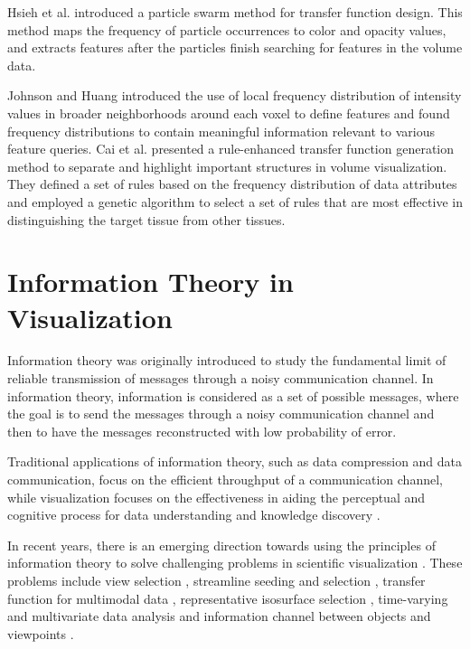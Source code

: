 Hsieh et al. \cite{hsieh_feature_2013} introduced a particle swarm method for transfer function design. This method maps the frequency of particle occurrences to color and opacity values, and extracts features after the particles finish searching for features in the volume data.

Johnson and Huang \cite{johnson_distribution-driven_2009} introduced the use of local frequency distribution of intensity values in broader neighborhoods around each voxel to define features and found frequency distributions to contain meaningful information relevant to various feature queries.
Cai et al. \cite{cai_rule-enhanced_2015} presented a rule-enhanced transfer function generation method to separate and highlight important structures in volume visualization. They defined a set of rules based on the frequency distribution of data attributes and employed a genetic algorithm to select a set of rules that are most effective in distinguishing the target tissue from other tissues.

\section{Information Theory in Visualization}
Information theory \cite{shannon_mathematical_1948} was originally introduced to study the fundamental limit of reliable transmission of messages through a noisy communication channel. In information theory, information is considered as a set of possible messages, where the goal is to send the messages through a noisy communication channel and then to have the messages reconstructed with low probability of error.

Traditional applications of information theory, such as data compression and data communication, focus on the efficient throughput of a communication channel, while visualization focuses on the effectiveness in aiding the perceptual and cognitive process for data understanding and knowledge discovery \cite{sbert_information_2009}.

In recent years, there is an emerging direction towards using the principles of information theory to solve challenging problems in scientific visualization \cite{wang_information_2011}. These problems include view selection \cite{bordoloi_view_2005} \cite{takahashi_feature-driven_2005} \cite{feixas_unified_2009}, streamline seeding and selection \cite{xu_information-theoretic_2010} \cite{lee_view_2011}, transfer function for multimodal data \cite{bramon_multimodal_2012}, representative isosurface selection \cite{wang_lod_2006}, time-varying and multivariate data analysis \cite{wang_importance-driven_2008} and information channel between objects and viewpoints \cite{ruiz_viewpoint_2010}.

